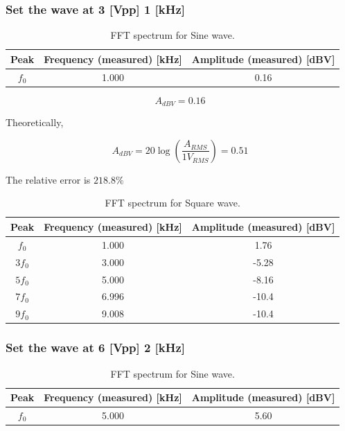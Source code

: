 \documentclass{article}
\begin{document}
\subsubsection{Set the wave at 3 [Vpp] 1 [kHz]}

\begin{table}[!h]
\begin{center}
\begin{tabular}{|c|c|c|}
\hline
Peak & Frequency (measured) [kHz] & Amplitude (measured) [dBV] \\
\hline
$f_0$ &	1.000	&	0.16	\\
\hline
\end{tabular}
\caption{FFT spectrum for Sine wave.}
\label{tab-2}
\end{center}
\end{table}

$$A_{dBV}=0.16$$

Theoretically,

$$A_{dBV}=20\log\left(\frac{A_{RMS}}{1V_{RMS}}\right)=0.51$$

The relative error is $218.8\%$\\


\begin{table}[!h]
\begin{center}
\begin{tabular}{|c|c|c|}
\hline
Peak & Frequency (measured) [kHz] & Amplitude (measured) [dBV] \\
\hline
$f_0$  &	1.000	&	1.76	\\
\hline
$3f_0$ &	3.000	&	-5.28	\\
\hline
$5f_0$ &	5.000	&	-8.16	\\
\hline
$7f_0$ &	6.996	&	-10.4	\\
\hline
$9f_0$ &	9.008	&	-10.4	\\
\hline
\end{tabular}
\caption{FFT spectrum for Square wave.}
\label{tab-3}
\end{center}
\end{table}




\subsubsection{Set the wave at 6 [Vpp] 2 [kHz]}

\begin{table}[!h]
\begin{center}
\begin{tabular}{|c|c|c|}
\hline
Peak & Frequency (measured) [kHz] & Amplitude (measured) [dBV] \\
\hline
$f_0$ &	5.000	&	5.60	\\
\hline
\end{tabular}
\caption{FFT spectrum for Sine wave.}
\label{tab-4}
\end{center}
\end{table}
\end{document}
